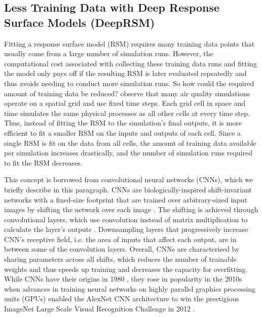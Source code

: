 \subsection{Less Training Data with Deep Response Surface Models (DeepRSM)} \label{txt:deep-rsm}

Fitting a response surface model (RSM) requires many training data points that usually come from a large number of simulation runs. However, the computational cost associated with collecting these training data runs and fitting the model only pays off if the resulting RSM is later evaluated repeatedly and thus avoids needing to conduct more simulation runs. So how could the required amount of training data be reduced? \textcite{deep-rsm-2020} observe that many air quality simulations operate on a spatial grid and use fixed time steps. Each grid cell in space and time simulates the same physical processes as all other cells at every time step. Thus, instead of fitting the RSM to the simulation's final outputs, it is more efficient to fit a smaller RSM on the inputs and outputs of each cell. Since a single RSM is fit on the data from all cells, the amount of training data available per simulation increases drastically, and the number of simulation runs required to fit the RSM decreases.

\newpar This concept is borrowed from convolutional neural networks (CNNs), which we briefly describe in this paragraph. CNNs are biologically-inspired shift-invariant networks with a fixed-size footprint that are trained over arbitrary-sized input images by shifting the network over each image \cite{cnn-1990}. The shifting is achieved through convolutional layers, which use convolution instead of matrix multiplication to calculate the layer's outputs \cite{neocognitron-1980}. Downsampling layers that progressively increase CNN's receptive field, i.e. the area of inputs that affect each output, are in between some of the convolution layers. Overall, CNNs are characterised by sharing parameters across all shifts, which reduces the number of trainable weights and thus speeds up training and decreases the capacity for overfitting. While CNNs have their origins in 1980 \cite{neocognitron-1980}, they rose in popularity in the 2010s when advances in training neural networks on highly parallel graphics processing units (GPUs) enabled the AlexNet CNN architecture to win the prestigious ImageNet Large Scale Visual Recognition Challenge in 2012 \cite{alexnet-2017}.

